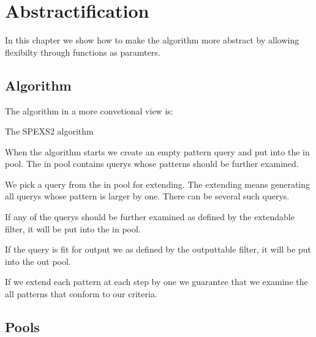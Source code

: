 \chapter{Abstractification}

In this chapter we show how to make the algorithm more abstract by allowing flexibilty through functions as paramters.

\section{Algorithm}

The algorithm in a more convetional view is:

\begin{algorithm}[H]
	\caption{The SPEXS2 algorithm}
\begin{algorithmic}[1]
			\EndIf
			\EndIf
		\EndFor
	\EndWhile
\end{algorithmic}
\end{algorithm}

When the algorithm starts we create an empty pattern query and put 
into the in pool. The in pool contains querys whose patterns
should be further examined.

We pick a query from the in pool for extending. The extending means
generating all querys whose pattern is larger by one. There can be
several such querys.

If any of the querys should be further examined as defined by the
extendable filter, it will be put into the in pool.

If the query is fit for output we as defined by the outputtable filter,
it will be put into the out pool.

If we extend each pattern at each step by one we guarantee that we
examine the all patterns that conform to our criteria.

\section{Pools}

